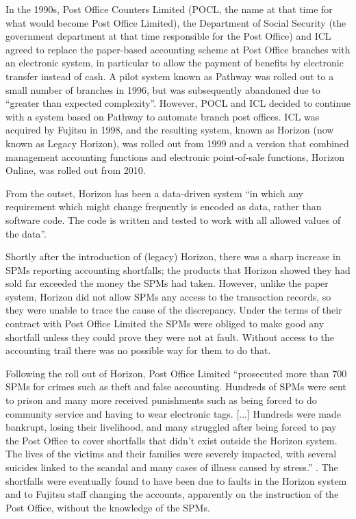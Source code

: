 In the 1990s, Post Office Counters Limited (POCL, the name at that time for what would become Post Office Limited), the Department of Social Security (the government department at that time responsible for the Post Office) and ICL agreed to replace the paper-based accounting scheme at Post Office branches with an electronic system, in particular to allow the payment of benefits by electronic transfer instead of cash. A pilot system known as Pathway was rolled out to a small number of branches in 1996, but was subsequently abandoned due to ``greater than expected complexity''. However, POCL and ICL decided to continue with a system based on Pathway to automate branch post offices. ICL was acquired by Fujitsu in 1998, and the resulting system, known as Horizon (now known as Legacy Horizon), was rolled out from 1999 and a version that combined management accounting functions and electronic point-of-sale functions, Horizon Online, was rolled out from 2010.

From the outset, Horizon has been a data-driven system ``in which any requirement which
might change frequently is encoded as data, rather than software code. The code is
written and tested to work with all allowed values of the data''\cite{citation:bates_v_pol_tech}. 

Shortly after the introduction of (legacy) Horizon, there was a sharp increase in SPMs reporting accounting shortfalls; the products that Horizon showed they had sold far exceeded the money the SPMs had taken. However, unlike the paper system, Horizon did not allow SPMs any access to the transaction records, so they were unable to trace the cause of the discrepancy. Under the terms of their contract with Post Office Limited the SPMs were obliged to make good any shortfall unless they could prove they were not at fault. Without access to the accounting trail there was no possible way for them to do that.

Following the roll out of Horizon, Post Office Limited ``prosecuted more than 700 SPMs  for crimes such as theft and false accounting. Hundreds of SPMs were sent to prison and many more received punishments such as being forced to do community service and having to wear electronic tags. [...] Hundreds were made bankrupt, losing their livelihood, and many struggled after being forced to pay the Post Office to cover shortfalls that didn’t exist outside the Horizon system. The lives of the victims and their families were severely impacted, with several suicides linked to the scandal and many cases of illness caused by stress.'' \cite{citation:cw_horizon}. The shortfalls were eventually found to have been due to faults in the Horizon system and to Fujitsu staff changing the accounts, apparently on the instruction of the Post Office, without the knowledge of the SPMs.

